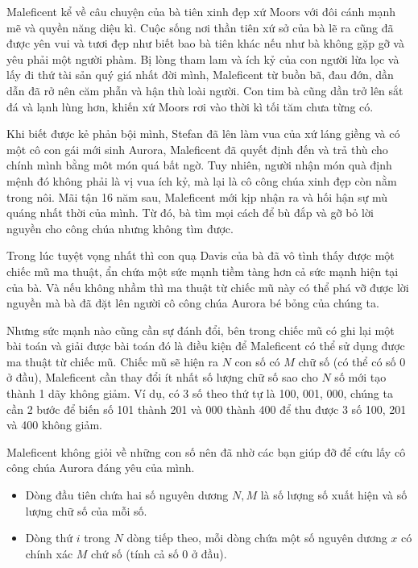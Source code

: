 \documentclass[12pt,a4paper,oneside]{article}
\begin{document}

Maleficent kể về câu chuyện của bà tiên xinh đẹp xứ Moors với đôi cánh mạnh mẽ và quyền năng diệu kì. Cuộc sống nơi thần tiên xứ sở của bà lẽ ra cũng đã được yên vui và tươi đẹp như biết bao bà tiên khác nếu như bà không gặp gỡ và yêu phải một người phàm. Bị lòng tham lam và ích kỷ của con người lừa lọc và lấy đi thứ tài sản quý giá nhất đời mình, Maleficent từ buồn bã, đau đớn, dần dẫn đã rở nên căm phẫn và hận thù loài người. Con tim bà cũng dần trở lên sắt đá và lạnh lùng hơn, khiến xứ Moors rơi vào thời kì tối tăm chưa từng có. 

Khi biết được kẻ phản bội mình, Stefan đã lên làm vua của xứ láng giềng và có một cô con gái mới sinh Aurora, Maleficent đã quyết định đến và trả thù cho chính mình bằng môt món quá bất ngờ. Tuy nhiên, người nhận món quà định mệnh đó không phải là vị vua ích kỷ, mà lại là cô công chúa xinh đẹp còn nằm trong nôi. Mãi tận 16 năm sau, Maleficent mới kịp nhận ra và hối hận sự mù quáng nhất thời của mình. Từ đó, bà tìm mọi cách để bù đắp và gỡ bỏ lời nguyền cho công chúa nhưng không tìm được.

Trong lúc tuyệt vọng nhất thì con quạ Davis của bà đã vô tình thấy được một chiếc mũ ma thuật, ẩn chứa một sức mạnh tiềm tàng hơn cả sức mạnh hiện tại của bà. Và nếu không nhầm thì ma thuật từ chiếc mũ này có thể phá vỡ được lời nguyền mà bà đã đặt lên người cô công chúa Aurora bé bỏng của chúng ta. 

Nhưng sức mạnh nào cũng cần sự đánh đổi, bên trong chiếc mũ có ghi lại một bài toán và giải được bài toán đó là điều kiện để Maleficent có thể sử dụng được ma thuật từ chiếc mũ. Chiếc mũ sẽ hiện ra $N$ con số có $M$ chữ số (có thể có số 0 ở đầu), Maleficent cần thay đổi ít nhất số lượng chữ số sao cho $N$ số mới tạo thành 1 dãy không giảm. Ví dụ, có 3 số theo thứ tự là 100, 001, 000, chúng ta cần 2 bước để biến số 101 thành 201 và 000 thành 400 để thu được 3 số 100, 201 và 400 không giảm. 

Maleficent không giỏi về những con số nên đã nhờ các bạn giúp đỡ để cứu lấy cô công chúa Aurora đáng yêu của mình. 

\renewcommand{\baselinestretch}{1.25}
\setlength{\parskip}{1em}

\renewcommand{\baselinestretch}{1.0}
\setlength{\parskip}{0.25em}



\begin{itemize}
   \item Dòng đầu tiên chứa hai số nguyên dương $N, M$ là số lượng số xuất hiện và số lượng chữ số của mỗi số.
   \item Dòng thứ $i$ trong $N$ dòng tiếp theo, mỗi dòng chứa một số nguyên dương $x$ có chính xác $M$ chứ số (tính cả số 0 ở đầu).
\end{itemize}
\end{document}
